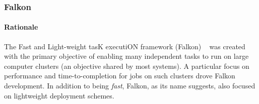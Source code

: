 \documentclass{sig-alternate}
\begin{document}
%
%
%
%
%
%
%
%
%


\subsubsection{Falkon}


\paragraph{Rationale}
The Fast and Light-weight tasK executiON framework (Falkon)
~\cite{1362680} was created with the primary objective
of enabling many independent tasks to run on large computer
clusters (an objective shared by most \pilotjob systems).
A particular focus on performance and time-to-completion for jobs
on such clusters drove Falkon development. In
addition to being \textit{fast}, Falkon, as its name suggests,
also focused on lightweight deployment schemes.
\end{document}
